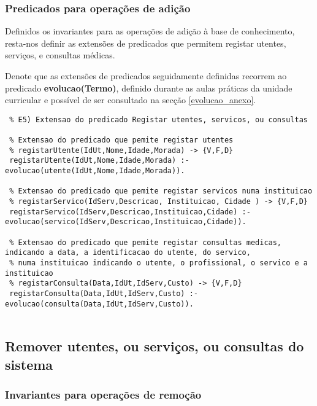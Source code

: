 \documentclass[
  oneside,
  10pt, a4paper,
  footinclude=true,
  headinclude=true,
  cleardoublepage=empty
]{scrbook}
\begin{document}
\begin{itemize}
\end{itemize}
\subsubsection{Predicados para operações de adição}
Definidos os invariantes para as operações de adição à base de conhecimento, resta-nos definir as extensões de predicados que permitem registar utentes, serviços, e consultas médicas.\par
Denote que as extensões de predicados seguidamente definidas recorrem ao predicado \textbf{evolucao(Termo)}, definido durante as aulas práticas da unidade curricular e possível de ser consultado na secção \ref{evolucao_anexo}.

\begin{lstlisting}
 % E5) Extensao do predicado Registar utentes, servicos, ou consultas
 
 % Extensao do predicado que pemite registar utentes
 % registarUtente(IdUt,Nome,Idade,Morada) -> {V,F,D}
 registarUtente(IdUt,Nome,Idade,Morada) :- evolucao(utente(IdUt,Nome,Idade,Morada)).
 
 % Extensao do predicado que pemite registar servicos numa instituicao
 % registarServico(IdServ,Descricao, Instituicao, Cidade ) -> {V,F,D}
 registarServico(IdServ,Descricao,Instituicao,Cidade) :- evolucao(servico(IdServ,Descricao,Instituicao,Cidade)).
 
 % Extensao do predicado que pemite registar consultas medicas, indicando a data, a identificacao do utente, do servico,
 % numa instituicao indicando o utente, o profissional, o servico e a instituicao
 % registarConsulta(Data,IdUt,IdServ,Custo) -> {V,F,D}
 registarConsulta(Data,IdUt,IdServ,Custo) :- evolucao(consulta(Data,IdUt,IdServ,Custo)).
 
\end{lstlisting}


\subsection{Remover utentes, ou serviços, ou consultas do sistema}
\label{remocao}

\subsubsection{Invariantes para operações de remoção}
\label{invariantes_remocao}
\end{document}
